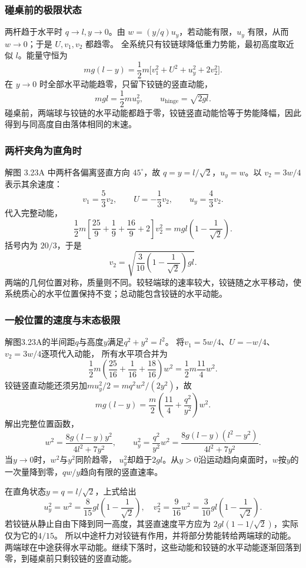 \documentclass[UTF8,fontset=fandol,a4paper,11pt]{ctexart}
\begin{document}
\subsubsection*{碰桌前的极限状态}
两杆趋于水平时 $q\to l,y\to0$。由 $w=(y/q)u_y$，若动能有限，$u_y$ 有限，从而 $w\to0$；于是 $U,v_1,v_2$ 都趋零。
全系统只有铰链球降低重力势能，最初高度取近似 $l$。能量守恒为
\[
m g(l-y)=\frac12m\bigl[v_1^2+U^2+u_y^2+2v_2^2\bigr].
\]
在 $y\to0$ 时全部水平动能趋零，只留下铰链的竖直动能，
\[
mgl=\frac12mu_y^2,\qquad
\boxed{u_{\mathrm{hinge}}=\sqrt{2gl}}.
\]
碰桌前，两端球与铰链的水平动能都趋于零，铰链竖直动能恰等于势能降幅，因此得到与同高度自由落体相同的末速。

\subsubsection*{两杆夹角为直角时}
解图 3.23A 中两杆各偏离竖直方向 $45^\circ$，故 $q=y=l/\sqrt2$，$u_y=w$。以 $v_2=3w/4$ 表示其余速度：
\[
v_1=\frac53v_2,\qquad U=-\frac13v_2,\qquad
u_y=\frac43v_2.
\]
代入完整动能，
\[
\frac12m\left[\frac{25}{9}+\frac19+\frac{16}{9}+2\right]v_2^2
=mgl\left(1-\frac1{\sqrt2}\right).
\]
括号内为 $20/3$，于是
\[
\boxed{v_2=\sqrt{\frac3{10}
\left(1-\frac1{\sqrt2}\right)gl}}.
\]
两端的几何位置对称，质量则不同。较轻端球的速率较大，铰链随之水平移动，使系统质心的水平位置保持不变；总动能包含铰链的水平动能。
\subsubsection*{一般位置的速度与末态极限}
解图3.23A的半间距$q$与高度$y$满足$q^2+y^2=l^2$。
将$v_1=5w/4$、$U=-w/4$、$v_2=3w/4$逐项代入动能，
所有水平项合并为
\[
\frac12m\left(\frac{25}{16}+\frac1{16}+\frac{18}{16}\right)w^2
=\frac12m\frac{11}{4}w^2.
\]
铰链竖直动能还须另加$mu_y^2/2=mq^2w^2/(2y^2)$，故
\[
mg(l-y)=\frac m2\left(\frac{11}{4}+\frac{q^2}{y^2}\right)w^2.
\]
解出完整位置函数，
\[
w^2=\frac{8g(l-y)y^2}{4l^2+7y^2},\qquad
u_y^2=\frac{q^2}{y^2}w^2
=\frac{8g(l-y)(l^2-y^2)}{4l^2+7y^2}.
\]
当$y\to0$时，$w^2$与$y^2$同阶趋零，
$u_y^2$却趋于$2gl$。从$y>0$沿运动趋向桌面时，$w$按$y$的一次量降到零，$qw/y$趋向有限的竖直速率。

在直角状态$y=q=l/\sqrt2$，上式给出
\[
u_y^2=w^2=\frac8{15}gl\left(1-\frac1{\sqrt2}\right),
\quad v_2^2=\frac9{16}w^2
=\frac3{10}gl\left(1-\frac1{\sqrt2}\right).
\]
若铰链从静止自由下降到同一高度，其竖直速度平方应为
$2gl(1-1/\sqrt2)$，实际仅为它的$4/15$。
所以中途杆力对铰链有作用，并将部分势能转给两端球的动能。
两端球在中途获得水平动能。继续下落时，这些动能和铰链的水平动能逐渐回落到零，到碰桌前只剩铰链的竖直动能。
\end{document}
